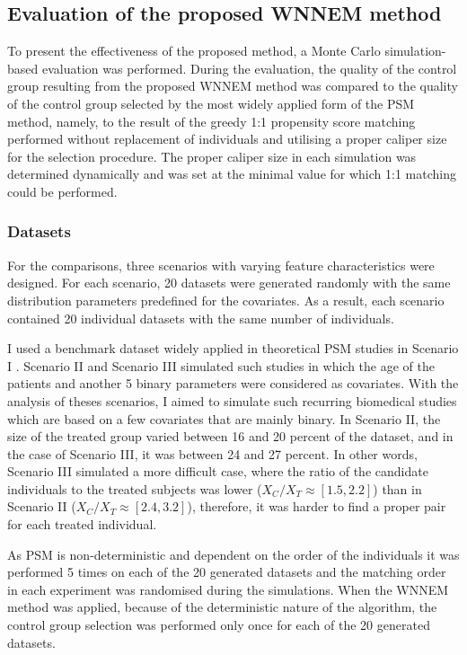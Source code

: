 		\subsection{Evaluation of the proposed WNNEM method}
		\label{sec:eval_wnnem}
								
		To present the effectiveness of the proposed method, a Monte Carlo simulation-based evaluation was performed. During the evaluation, the quality of the control group resulting from the proposed WNNEM method was compared to the quality of the control group selected by the most widely applied form of the PSM method, namely, to the result of the greedy 1:1 propensity score matching performed without replacement of individuals and utilising a proper caliper size for the selection procedure. The proper caliper size in each simulation was determined dynamically and was set at the minimal value for which 1:1 matching could be performed.
				        
		\subsubsection{Datasets}
		\label{sec:datasets_wnnem}
								
		For the comparisons, three scenarios with varying feature characteristics were designed. For each scenario, 20 datasets were generated randomly with the same distribution parameters predefined for the covariates. As a result, each scenario contained 20 individual datasets with the same number of individuals.
				  
		I used a benchmark dataset widely applied in theoretical PSM studies in Scenario I  \cite{austin2011comparing}. Scenario II and Scenario III simulated such studies in which the age of the patients and another 5 binary parameters were considered as covariates. With the analysis of theses scenarios, I aimed to simulate such recurring biomedical studies which are based on a few covariates that are mainly binary. In Scenario II, the size of the treated group varied between 16 and 20 percent of the dataset, and in the case of Scenario III, it was between 24 and 27 percent. In other words, Scenario III simulated a more difficult case, where the ratio of the candidate individuals to the treated subjects was lower ($X_C/X_T \approx [1.5,2.2]$) than in Scenario II ($X_C/X_T \approx [2.4,3.2]$), therefore, it was harder to find a proper pair for each treated individual.
								
		As PSM is non-deterministic and dependent on the order of the individuals it was performed 5 times on each of the 20 generated datasets and the matching order in each experiment was randomised during the simulations. When the WNNEM method was applied, because of the deterministic nature of the algorithm, the control group selection was performed only once for each of the 20 generated datasets.
								
